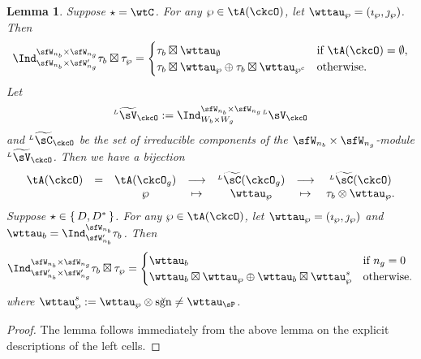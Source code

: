 \documentclass[12pt,a4paper]{amsart}
\newcommand{\sgn}{\operatorname{sgn}}
\numberwithin{equation}{section}
\newtheorem{lem}[thm]{Lemma}
\theoremstyle{remark}
\def\LV{{}^{\scriptscriptstyle L}\sV}
\def\LV{{}^{\scriptscriptstyle L}\sV}
\def\tLV{{}^{\scriptscriptstyle L}\widetilde{\sV}}
\def\tLC{{}^{\scriptscriptstyle L}\widetilde{\sC}}
\def\brsgn{\breve{\sgn}}
\begin{document}
\begin{lem}\label{lem:WLcell}
  Suppose $\star=\wtC$. For any $\wp\in \tA(\ckcO)$, let
  $\wttau_{\wp} = (\imath_{\wp},\jmath_{\wp})$. Then
  \[
    \Ind_{\sfW_{n_{b}}\times \sfW'_{n_{g}}}^{\sfW_{n_{b}}\times \sfW_{n_{g}}} \tau_{b}\boxtimes \tau_{\wp} =
    \begin{cases}
      \tau_{b}\boxtimes \wttau_{\emptyset} & \text{if } \tA(\ckcO) =\emptyset,\\
      \tau_{b}\boxtimes \wttau_{\wp} \oplus \tau_{b}\boxtimes \wttau_{\wp^{c}}
      &\text{otherwise}.
    \end{cases}
  \]
Let
\[
  \tLV_{\ckcO}:= \Ind_{W_{b}\times W_{g}}^{\sfW_{n_{b}}\times \sfW_{n_{g}}}\LV_{\ckcO}
\]
and $\tLC_{\ckcO}$ be the set of irreducible components of the
$\sfW_{n_{b}}\times \sfW_{n_{g}}$-module $\tLV_{\ckcO}$. Then we have a
bijection
  \[
      \begin{array}{lccccccc}
        \tA(\ckcO)&=&\tA(\ckcO_{g}) & \longrightarrow & \tLC(\ckcO_{g})
        & \longrightarrow & \tLC(\ckcO)\\
                  &  &\wp & \mapsto & \wttau_{\wp}
        & \mapsto & \tau_{b}\otimes \wttau_{\wp}.
      \end{array}
  \]
  Suppose $\star\in\set{D,D^{*}}$. For any $\wp\in \tA(\ckcO)$, let
  $\wttau_{\wp} = (\imath_{\wp},\jmath_{\wp})$ and $\wttau_{b} = \Ind_{\sfW'_{n_{b}}}^{\sfW_{n_{b}}}\tau_{b}$.
  Then
  \[
    \Ind_{\sfW'_{n_{b}}\times \sfW'_{n_{g}}}^{\sfW_{n_{b}}\times \sfW_{n_{g}}} \tau_{b}\boxtimes \tau_{\wp} =
    \begin{cases}
      \wttau_{b} & \text{if } n_{g}=0\\
      \wttau_{b}\boxtimes \wttau_{\wp} \oplus \wttau_{b}\boxtimes \wttau_{\wp}^{s}
      &\text{otherwise}.
    \end{cases}
  \]
  where $\wttau_{\wp}^{s}:= \wttau_{\wp}\otimes \brsgn \neq \wttau_{\sP}$.

\end{lem}
\begin{proof}
  The lemma follows immediately from the above lemma on the explicit
  descriptions of the left cells.
\end{proof}
\end{document}
